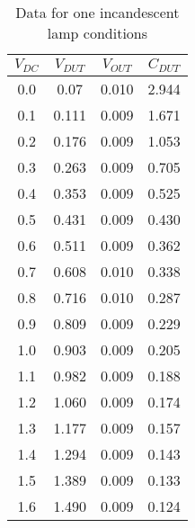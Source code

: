 \begin{table}[!ht]
    \centering
    \begin{tabular}{|c|c|c|c|}
        \hline
        $V_{DC}$ & $V_{DUT}$ & $V_{OUT}$ & $C_{DUT}$ \\ \hline
        0.0      & 0.07      & 0.010     & 2.944     \\
        0.1      & 0.111     & 0.009     & 1.671     \\
        0.2      & 0.176     & 0.009     & 1.053     \\
        0.3      & 0.263     & 0.009     & 0.705     \\
        0.4      & 0.353     & 0.009     & 0.525     \\
        0.5      & 0.431     & 0.009     & 0.430     \\
        0.6      & 0.511     & 0.009     & 0.362     \\
        0.7      & 0.608     & 0.010     & 0.338     \\
        0.8      & 0.716     & 0.010     & 0.287     \\
        0.9      & 0.809     & 0.009     & 0.229     \\
        1.0      & 0.903     & 0.009     & 0.205     \\
        1.1      & 0.982     & 0.009     & 0.188     \\
        1.2      & 1.060     & 0.009     & 0.174     \\
        1.3      & 1.177     & 0.009     & 0.157     \\
        1.4      & 1.294     & 0.009     & 0.143     \\
        1.5      & 1.389     & 0.009     & 0.133     \\
        1.6      & 1.490     & 0.009     & 0.124     \\ \hline
    \end{tabular}
    \caption{Data for one incandescent lamp conditions}
    \label{tab:4}
\end{table}